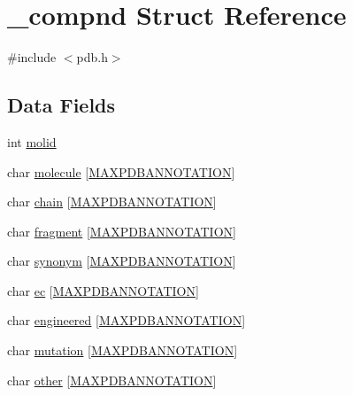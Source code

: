 \hypertarget{struct__compnd}{\section{\-\_\-compnd Struct Reference}
\label{struct__compnd}
}


{\ttfamily \#include $<$pdb.\-h$>$}

\subsection*{Data Fields}
\begin{DoxyCompactItemize}
\item 
int \hyperlink{struct__compnd_ae2b837562f7605f66a1c7817a1c820ef}{molid}
\item 
char \hyperlink{struct__compnd_aaa2c1f2957c0b08a914fe7a09abb1318}{molecule} \mbox{[}\hyperlink{pdb_8h_a36d777b67f3c5ea7f278936e66305787}{M\-A\-X\-P\-D\-B\-A\-N\-N\-O\-T\-A\-T\-I\-O\-N}\mbox{]}
\item 
char \hyperlink{struct__compnd_a9d34969ea8f7d3effdf008e57acc3450}{chain} \mbox{[}\hyperlink{pdb_8h_a36d777b67f3c5ea7f278936e66305787}{M\-A\-X\-P\-D\-B\-A\-N\-N\-O\-T\-A\-T\-I\-O\-N}\mbox{]}
\item 
char \hyperlink{struct__compnd_ad4c629b977ff4356d22f7a98d349bad3}{fragment} \mbox{[}\hyperlink{pdb_8h_a36d777b67f3c5ea7f278936e66305787}{M\-A\-X\-P\-D\-B\-A\-N\-N\-O\-T\-A\-T\-I\-O\-N}\mbox{]}
\item 
char \hyperlink{struct__compnd_a0e6ae9ba6df02f199726b0e5fe84dc39}{synonym} \mbox{[}\hyperlink{pdb_8h_a36d777b67f3c5ea7f278936e66305787}{M\-A\-X\-P\-D\-B\-A\-N\-N\-O\-T\-A\-T\-I\-O\-N}\mbox{]}
\item 
char \hyperlink{struct__compnd_aec604847eceb625b2ed92d4097de0ab5}{ec} \mbox{[}\hyperlink{pdb_8h_a36d777b67f3c5ea7f278936e66305787}{M\-A\-X\-P\-D\-B\-A\-N\-N\-O\-T\-A\-T\-I\-O\-N}\mbox{]}
\item 
char \hyperlink{struct__compnd_ad3279472c5db456acceb7be10ede7013}{engineered} \mbox{[}\hyperlink{pdb_8h_a36d777b67f3c5ea7f278936e66305787}{M\-A\-X\-P\-D\-B\-A\-N\-N\-O\-T\-A\-T\-I\-O\-N}\mbox{]}
\item 
char \hyperlink{struct__compnd_a69171cd20bd13efd3797554a1d417642}{mutation} \mbox{[}\hyperlink{pdb_8h_a36d777b67f3c5ea7f278936e66305787}{M\-A\-X\-P\-D\-B\-A\-N\-N\-O\-T\-A\-T\-I\-O\-N}\mbox{]}
\item 
char \hyperlink{struct__compnd_a493c1799fb4b2c44a49be047341dc2aa}{other} \mbox{[}\hyperlink{pdb_8h_a36d777b67f3c5ea7f278936e66305787}{M\-A\-X\-P\-D\-B\-A\-N\-N\-O\-T\-A\-T\-I\-O\-N}\mbox{]}
\end{DoxyCompactItemize}


